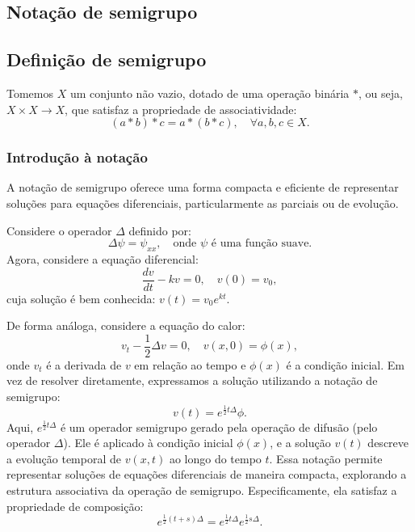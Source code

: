 \documentclass[12pt]{article}
\begin{document}
\subsection{Notação de semigrupo}
\subsection{Definição de semigrupo}
Tomemos $X$ um conjunto não vazio, dotado de uma operação binária $ * $, ou seja, $ X \times X \to X $, que satisfaz a propriedade de associatividade:
\begin{equation*}
	(a * b) * c = a * (b * c), \quad \forall a,b,c \in X.
\end{equation*}

\subsubsection{Introdução à notação}
A notação de semigrupo oferece uma forma compacta e eficiente de representar soluções para equações diferenciais, particularmente as parciais ou de evolução.

Considere o operador $\Delta$ definido por:
\begin{equation*}
	\Delta \psi = \psi_{xx}, \quad \text{onde $\psi$ é uma função suave}.
\end{equation*}
Agora, considere a equação diferencial:
\begin{equation*}
	\frac{dv}{dt} - kv = 0, \quad v(0) = v_0,
\end{equation*}
cuja solução é bem conhecida: $ v(t) = v_0 e^{kt} $.

De forma análoga, considere a equação do calor:
\begin{equation*}
	v_t - \frac{1}{2} \Delta v = 0, \quad v(x, 0) = \phi(x),
\end{equation*}
onde $v_t$ é a derivada de $v$ em relação ao tempo e $\phi(x)$ é a condição inicial. Em vez de resolver diretamente, expressamos a solução utilizando a notação de semigrupo:
\begin{equation*}
	v(t) = e^{\frac{1}{2}t \Delta} \phi.
\end{equation*}
Aqui, $e^{\frac{1}{2}t \Delta}$ é um operador semigrupo gerado pela operação de difusão (pelo operador $\Delta$). Ele é aplicado à condição inicial $\phi(x)$, e a solução $v(t)$ descreve a evolução temporal de $v(x,t)$ ao longo do tempo $t$. Essa notação permite representar soluções de equações diferenciais de maneira compacta, explorando a estrutura associativa da operação de semigrupo. Especificamente, ela satisfaz a propriedade de composição:
\begin{equation*}
	e^{\frac{1}{2}(t+s)\Delta} = e^{\frac{1}{2}t \Delta} e^{\frac{1}{2}s \Delta}.
\end{equation*}
\end{document}
